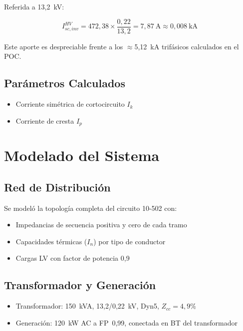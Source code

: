 Referida a 13,2~kV:

\begin{equation}
I_{sc,inv}^{HV} = 472{,}38\times\frac{0{,}22}{13{,}2} = 7{,}87~\text{A} \approx 0{,}008~\text{kA}
\end{equation}

Este aporte es despreciable frente a los $\approx$5,12~kA trifásicos calculados en el POC.

\subsection{Parámetros Calculados}

\begin{itemize}
    \item Corriente simétrica de cortocircuito $I_k$
    \item Corriente de cresta $I_p$
\end{itemize}

\section{Modelado del Sistema}

\subsection{Red de Distribución}

Se modeló la topología completa del circuito 10-502 con:

\begin{itemize}
    \item Impedancias de secuencia positiva y cero de cada tramo
    \item Capacidades térmicas ($I_n$) por tipo de conductor
    \item Cargas LV con factor de potencia 0,9
\end{itemize}

\subsection{Transformador y Generación}

\begin{itemize}
    \item Transformador: 150~kVA, 13,2/0,22~kV, Dyn5, $Z_{cc}=4{,}9\%$
    \item Generación: 120~kW AC a FP~0,99, conectada en BT del transformador
\end{itemize}

